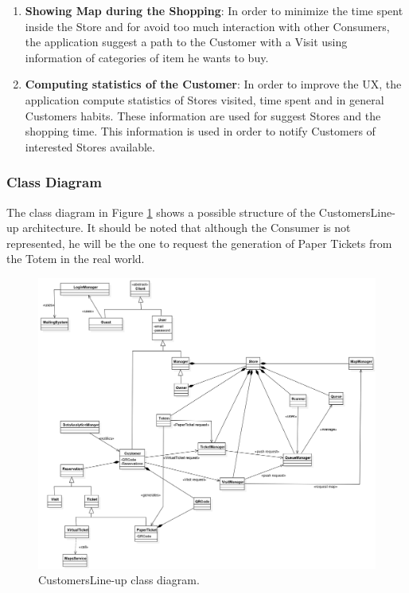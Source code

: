 \documentclass[a4paper, 12pt, oneside]{article}
\newcommand{\yasmin}[1]{\textcolor{Red}{#1}}
\newcommand{\giovanni}[1]{\textcolor{Blue}{#1}}
\begin{document}
\begin{enumerate}
\item \textbf{Showing Map during the Shopping}: In order to minimize the time spent inside the Store and for avoid too much interaction with other Consumers, the application suggest a path to the Customer with a Visit using information of categories of item he wants to buy.

\item \textbf{Computing statistics of the Customer}: In order to improve the UX, the application compute statistics of Stores visited, time spent and in general Customers habits. These information are used for suggest Stores and the shopping time. This information is used in order to notify Customers of interested Stores available. %
\end{enumerate}
\subsubsection{Class Diagram}
The class diagram in Figure \ref{class_diagram} shows a possible structure of the CustomersLine-up architecture. It should be noted that although the Consumer is not represented, he will be the one to request the generation of Paper Tickets from the Totem in the real world.
\begin{figure}[h!]
\centering
	\centering
  	\includegraphics[height=0.55\textheight, scale=0.2, keepaspectratio]{img/class_diagram.jpg}
	\caption{CustomersLine-up class diagram.}
 	\label{class_diagram}
\end{figure}
\end{document}
